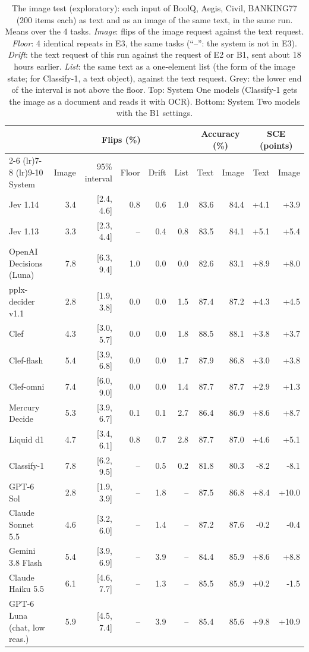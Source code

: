 \begin{table}[t]
\centering
\small
\setlength{\tabcolsep}{4pt}
\begin{tabular}{@{}lrrrrrrrrr@{}}
\toprule
 & \multicolumn{5}{c}{Flips (\%)} & \multicolumn{2}{c}{Accuracy (\%)} & \multicolumn{2}{c}{SCE (points)} \\
\cmidrule(lr){2-6} \cmidrule(lr){7-8} \cmidrule(lr){9-10}
System & Image & 95\% interval & Floor & Drift & List & Text & Image & Text & Image \\
\midrule
Jev 1.14 & 3.4 & [2.4, 4.6] & 0.8 & 0.6 & 1.0 & 83.6 & 84.4 & +4.1 & +3.9 \\
Jev 1.13 & 3.3 & [2.3, 4.4] & -- & 0.4 & 0.8 & 83.5 & 84.1 & +5.1 & +5.4 \\
OpenAI Decisions (Luna) & 7.8 & [6.3, 9.4] & 1.0 & 0.0 & 0.0 & 82.6 & 83.1 & +8.9 & +8.0 \\
pplx-decider v1.1 & 2.8 & [1.9, 3.8] & 0.0 & 0.0 & 1.5 & 87.4 & 87.2 & +4.3 & +4.5 \\
Clef & 4.3 & [3.0, 5.7] & 0.0 & 0.0 & 1.8 & 88.5 & 88.1 & +3.8 & +3.7 \\
Clef-flash & 5.4 & [3.9, 6.8] & 0.0 & 0.0 & 1.7 & 87.9 & 86.8 & +3.0 & +3.8 \\
Clef-omni & 7.4 & [6.0, 9.0] & 0.0 & 0.0 & 1.4 & 87.7 & 87.7 & +2.9 & +1.3 \\
Mercury Decide & 5.3 & [3.9, 6.7] & 0.1 & 0.1 & 2.7 & 86.4 & 86.9 & +8.6 & +8.7 \\
Liquid d1 & 4.7 & [3.4, 6.1] & 0.8 & 0.7 & 2.8 & 87.7 & 87.0 & +4.6 & +5.1 \\
Classify-1 & 7.8 & [6.2, 9.5] & -- & 0.5 & 0.2 & 81.8 & 80.3 & -8.2 & -8.1 \\
\midrule
GPT-6 Sol & 2.8 & [1.9, 3.9] & -- & 1.8 & -- & 87.5 & 86.8 & +8.4 & +10.0 \\
Claude Sonnet 5.5 & 4.6 & [3.2, 6.0] & -- & 1.4 & -- & 87.2 & 87.6 & -0.2 & -0.4 \\
Gemini 3.8 Flash & 5.4 & [3.9, 6.9] & -- & 3.9 & -- & 84.4 & 85.9 & +8.6 & +8.8 \\
Claude Haiku 5.5 & 6.1 & [4.6, 7.7] & -- & 1.3 & -- & 85.5 & 85.9 & +0.2 & -1.5 \\
GPT-6 Luna (chat, low reas.) & 5.9 & [4.5, 7.4] & -- & 3.9 & -- & 85.4 & 85.6 & +9.8 & +10.9 \\
\bottomrule
\end{tabular}
\caption{The image test (exploratory): each input of BoolQ, Aegis, Civil, BANKING77 (200 items each) as text and as an image of the same text, in the same run. Means over the 4 tasks. \emph{Image}: flips of the image request against the text request. \emph{Floor}: 4 identical repeats in E3, the same tasks (``--'': the system is not in E3). \emph{Drift}: the text request of this run against the request of E2 or B1, sent about 18 hours earlier. \emph{List}: the same text as a one-element list (the form of the image state; for Classify-1, a text object), against the text request. Grey: the lower end of the interval is not above the floor. Top: System One models (Classify-1 gets the image as a document and reads it with OCR). Bottom: System Two models with the B1 settings.}
\label{tab:app-image}
\end{table}
